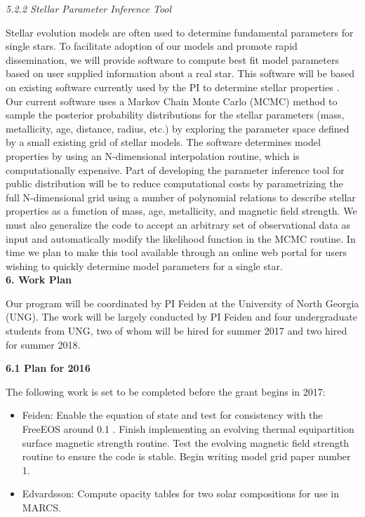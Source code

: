 {\it 5.2.2 Stellar Parameter Inference Tool}

Stellar evolution models are often used to determine fundamental parameters for single stars. To facilitate adoption of our models and promote rapid dissemination, we will provide software to compute best fit model parameters based on user supplied information about a real star. This software will be based on existing software currently used by the PI to determine stellar properties \citep{Boyajian2015, Mann2015, Mann2016, Gaidos2016}. Our current software uses a Markov Chain Monte Carlo (MCMC) method to sample the posterior probability distributions for the stellar parameters (mass, metallicity, age, distance, radius, etc.) by exploring the parameter space defined by a small existing grid of stellar models. The software determines model properties by using an N-dimensional interpolation routine, which is computationally expensive. Part of developing the parameter inference tool for public distribution will be to reduce computational costs by parametrizing the full N-dimensional grid using a number of polynomial relations to describe stellar properties as a function of mass, age, metallicity, and magnetic field strength. We must also generalize the code to accept an arbitrary set of observational data as input and automatically modify the likelihood function in the MCMC routine. In time we plan to make this tool available through an online web portal for users wishing to quickly determine model parameters for a single star. \\

{\bf\large 6. Work Plan} 

Our program will be coordinated by PI Feiden at the University of North Georgia (UNG). The work will be largely conducted by PI Feiden and four undergraduate students from UNG, two of whom will be hired for summer 2017 and two hired for summer 2018.

{\bf 6.1 Plan for 2016}

The following work is set to be completed before the grant begins in 2017:

\begin{itemize}
	\item[] Feiden: Enable the \citet{scvh95} equation of state and test for consistency with the FreeEOS around 0.1 \msun. Finish implementing an evolving thermal equipartition surface magnetic strength routine. Test the evolving magnetic field strength routine to ensure the code is stable. Begin writing model grid paper number 1. \\
	
	\item[] Edvardsson: Compute opacity tables for two solar compositions for use in MARCS. \\
\end{itemize} 

